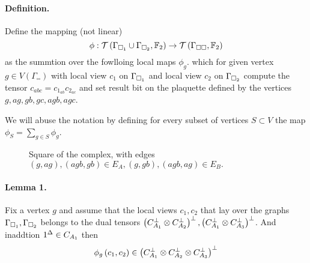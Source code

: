 \documentclass{article}
\begin{document}
\begin{multicols*}{2}
	\paragraph{Definition.} Define the mapping (not linear)  
	\begin{equation*}	
	\phi : \mathcal{T}\left(\Gamma_{\square_{1}} \cup \Gamma_{\square_{2}} , \mathbb{F}_2  \right) \rightarrow  \mathcal{T}\left( \Gamma_{\square \square}, \mathbb{F}_{2} \right)
      \end{equation*} 
      as the summtion over the fowlloing local maps $\phi_{g}$. which for given vertex $g \in V\left( \Gamma_{\square \square}\right)$ with local view $c_1$ on $\Gamma_{\square_{1}}$ and local view $c_2$ on $\Gamma_{\square_{2}}$ compute the tensor $c_{abc} = c_{1_{ab}}c_{2_{ac}}$ and set result bit on the plaquette defined by the vertices $ g, ag, gb, gc, agb, agc$.    

      We will abuse the notation by defining for every subset of vertices $S \subset V $  the map $\phi_S = \sum_{g \in S} \phi_{g}$. 

      \begin{figure}[H]
\begin{center}
\end{center}
\caption{Square of the complex, with edges $(g,ag), (agb, gb) \in E_A,
(g,gb), (agb, ag) \in E_B.$ \label{fig:square}
}
\end{figure}

      \paragraph{Lemma 1.} Fix a vertex $g$ and assume that the local views $c_1,c_2$ that lay over the graphs $\Gamma_{\square_{1}}, \Gamma_{\square_{2}}$ belongs to the dual tensors $\left( C_{A_{1}}^{\perp} \otimes C_{A_{2}}^{\perp} \right)^\perp, \left( C_{A_{1}}^{\perp} \otimes C_{A_{3}}^{\perp} \right)^\perp$. And inaddtion $ 1^{\Delta} \in C_{A_{1}} $ then 
      \begin{equation*}
      \phi_{g}\left( c_1, c_2 \right) \in \left( C_{A_{1}}^{\perp} \otimes C_{A_{2}}^{\perp} \otimes C_{A_{3}}^{\perp} \right)^\perp
    \end{equation*}

\end{multicols*}
\end{document}
